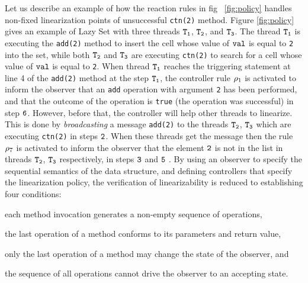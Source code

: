  Let us describe an example of how the reaction rules in fig ~\ref{fig:policy} handles non-fixed linearization points of unsuccessful {\tt ctn(2)} method. Figure \ref{fig:policy} gives an example of Lazy Set with three threads $\tt T_1$, $\tt T_2$, and $\tt T_3$. The thread $\tt T_1$ is executing the {\tt add(2)} method to insert the cell whose value of $\tt val$ is equal to {\tt 2} into the set, while both $\tt T_2$ and $\tt T_3$ are executing {\tt ctn(2)} to search for a cell whose value of $\tt val$ is equal to {\tt 2}. When thread $\tt T_1$ reaches the triggering statement at line 4 of the {\tt add(2)} method at the step $\tt T_1$, the controller rule $\rho_1$ is activated to inform the observer that an {\tt add} operation 
with argument {\tt 2} has been performed, and that the outcome
of the operation is {\tt true} (the operation was successful) in step $\tt 6$. However, before that, the controller will help other threads
to linearize. This is done by {\it broadcasting} a message {\tt add(2)} to the threads $\tt T_2$, $\tt T_3$ which are executing {\tt ctn(2)} in steps $\tt 2$. When these threads get the message then the rule $\rho_7$ is activated to inform the observer that the element $\tt 2$ is not in the list in threads $\tt T_2$, $\tt T_3$ respectively, in steps $\tt 3$ and $\tt 5$ .
%
 By using an observer to specify the sequential semantics of the
data structure, and defining controllers that specify the linearization policy,
the verification of linearizability is reduced to establishing four conditions:
\begin{inparaenum}[(i)]
\item
  each method invocation generates a non-empty sequence of operations,
\item
  the last operation of a method conforms to its parameters and return value,
\item
  only the last operation of a method may
  change the state of the observer,
  and
\item
  the sequence of all operations
  cannot drive the observer to an accepting state.
\end{inparaenum}
